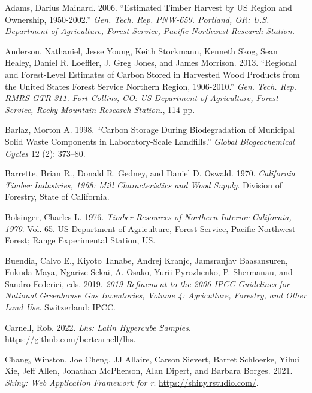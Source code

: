 \documentclass[
  openany]{book}
\newlength{\cslhangindent}
\newlength{\cslentryspacingunit} %
\newenvironment{CSLReferences}[2] %
 {%
  \setlength{\parindent}{0pt}
  \ifodd #1
  \let\oldpar\par
  \def\par{\hangindent=\cslhangindent\oldpar}
  \fi
  \setlength{\parskip}{#2\cslentryspacingunit}
 }%
 {}
\begin{document}
\hypertarget{refs}{}
\begin{CSLReferences}{1}{0}
\leavevmode{}%
Adams, Darius Mainard. 2006. {``Estimated Timber Harvest by US Region
and Ownership, 1950-2002.''} \emph{Gen. Tech. Rep. PNW-659. Portland,
OR: U.S. Department of Agriculture, Forest Service, Pacific Northwest
Research Station.}

\leavevmode{}%
Anderson, Nathaniel, Jesse Young, Keith Stockmann, Kenneth Skog, Sean
Healey, Daniel R. Loeffler, J. Greg Jones, and James Morrison. 2013.
{``Regional and Forest-Level Estimates of Carbon Stored in Harvested
Wood Products from the United States Forest Service Northern Region,
1906-2010.''} \emph{Gen. Tech. Rep. RMRS-GTR-311. Fort Collins, CO: US
Department of Agriculture, Forest Service, Rocky Mountain Research
Station.}, 114 pp.

\leavevmode{}%
Barlaz, Morton A. 1998. {``Carbon Storage During Biodegradation of
Municipal Solid Waste Components in Laboratory-Scale Landfills.''}
\emph{Global Biogeochemical Cycles} 12 (2): 373--80.

\leavevmode{}%
Barrette, Brian R., Donald R. Gedney, and Daniel D. Oswald. 1970.
\emph{California Timber Industries, 1968: Mill Characteristics and Wood
Supply}. Division of Forestry, State of California.

\leavevmode{}%
Bolsinger, Charles L. 1976. \emph{Timber Resources of Northern Interior
California, 1970}. Vol. 65. US Department of Agriculture, Forest
Service, Pacific Northwest Forest; Range Experimental Station, US.

\leavevmode{}%
Buendia, Calvo E., Kiyoto Tanabe, Andrej Kranjc, Jamsranjav Baasansuren,
Fukuda Maya, Ngarize Sekai, A. Osako, Yurii Pyrozhenko, P. Shermanau,
and Sandro Federici, eds. 2019. \emph{2019 Refinement to the 2006 IPCC
Guidelines for National Greenhouse Gas Inventories, Volume 4:
Agriculture, Forestry, and Other Land Use.} Switzerland: IPCC.

\leavevmode{}%
Carnell, Rob. 2022. \emph{Lhs: Latin Hypercube Samples}.
\url{https://github.com/bertcarnell/lhs}.

\leavevmode{}%
Chang, Winston, Joe Cheng, JJ Allaire, Carson Sievert, Barret Schloerke,
Yihui Xie, Jeff Allen, Jonathan McPherson, Alan Dipert, and Barbara
Borges. 2021. \emph{Shiny: Web Application Framework for r}.
\url{https://shiny.rstudio.com/}.


\end{CSLReferences}
\end{document}

